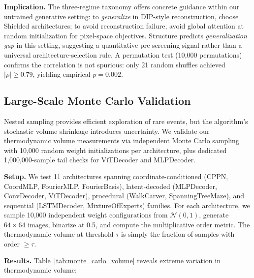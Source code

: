 \documentclass{article}
\begin{document}
\textbf{Implication.} The three-regime taxonomy offers concrete guidance within our untrained generative setting: to \emph{generalize} in DIP-style reconstruction, choose Shielded architectures; to avoid reconstruction failure, avoid global attention at random initialization for pixel-space objectives. Structure predicts \emph{generalization gap} in this setting, suggesting a quantitative pre-screening signal rather than a universal architecture-selection rule. A permutation test (10,000 permutations) confirms the correlation is not spurious: only 21 random shuffles achieved $|\rho| \geq 0.79$, yielding empirical $p = 0.002$.


\subsection{Large-Scale Monte Carlo Validation}
\label{sec:monte_carlo}


Nested sampling provides efficient exploration of rare events, but the algorithm's stochastic volume shrinkage introduces uncertainty. We validate our thermodynamic volume measurements via independent Monte Carlo sampling with 10,000 random weight initializations per architecture, plus dedicated 1,000,000-sample tail checks for ViTDecoder and MLPDecoder.

\textbf{Setup.} We test 11 architectures spanning coordinate-conditioned (CPPN, CoordMLP, FourierMLP, FourierBasis), latent-decoded (MLPDecoder, ConvDecoder, ViTDecoder), procedural (WalkCarver, SpanningTreeMaze), and sequential (LSTMDecoder, MixtureOfExperts) families. For each architecture, we sample 10,000 independent weight configurations from $\mathcal{N}(0,1)$, generate $64 \times 64$ images, binarize at 0.5, and compute the multiplicative order metric. The thermodynamic volume at threshold $\tau$ is simply the fraction of samples with order $\geq \tau$.

\textbf{Results.} Table~\ref{tab:monte_carlo_volume} reveals extreme variation in thermodynamic volume:
\end{document}
